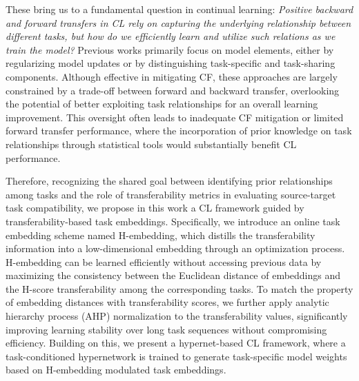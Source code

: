 These bring us to a fundamental question in continual learning: \textit{Positive backward and forward transfers in CL rely on capturing the underlying relationship between different tasks, but how do we efficiently learn and utilize such relations as we train the model?} Previous works primarily focus on model elements, either by regularizing model updates or by distinguishing task-specific and task-sharing components. Although effective in mitigating CF, these approaches are largely constrained by a trade-off between forward and backward transfer, overlooking the potential of better exploiting task relationships for an overall learning improvement. This oversight often leads to inadequate CF mitigation or limited forward transfer performance, where the incorporation of prior knowledge on task relationships through statistical tools would substantially benefit CL performance.

Therefore, recognizing the shared goal between identifying prior relationships among tasks and the role of transferability metrics \citep{ding2024model} in evaluating source-target task compatibility, we propose in this work a CL framework guided by transferability-based task embeddings. Specifically, we introduce an online task embedding scheme named H-embedding, which distills the transferability information into a low-dimensional embedding through an optimization process. H-embedding can be learned efficiently without accessing previous data by maximizing the consistency between the Euclidean distance of embeddings and the H-score \citep{bao2019information} transferability among the corresponding tasks. 
To match the property of embedding distances with transferability scores, we further apply analytic hierarchy process (AHP) normalization to the transferability values, significantly improving learning stability over long task sequences without compromising efficiency.
Building on this, we present a hypernet-based CL framework, where a task-conditioned hypernetwork \citep[more in Sec.~\ref{sec:relwork}]{von2020continual} is trained to generate task-specific model weights based on H-embedding modulated task embeddings.

